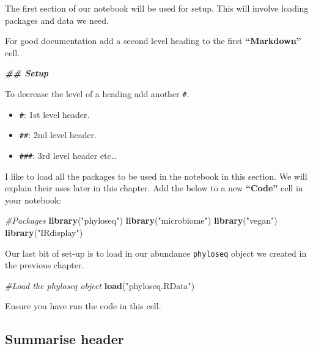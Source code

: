 \documentclass[
]{book}
\newenvironment{Shaded}{\begin{snugshade}}{\end{snugshade}}
\newcommand{\CommentTok}[1]{\textcolor[rgb]{0.56,0.35,0.01}{\textit{#1}}}
\newcommand{\DocumentationTok}[1]{\textcolor[rgb]{0.56,0.35,0.01}{\textbf{\textit{#1}}}}
\newcommand{\FunctionTok}[1]{\textcolor[rgb]{0.13,0.29,0.53}{\textbf{#1}}}
\newcommand{\NormalTok}[1]{#1}
\newcommand{\StringTok}[1]{\textcolor[rgb]{0.31,0.60,0.02}{#1}}
\providecommand{\tightlist}{%
  \setlength{\itemsep}{0pt}\setlength{\parskip}{0pt}}
\begin{document}
The first section of our notebook will be used for setup.
This will involve loading packages and data we need.

For good documentation add a second level heading to the first \textbf{``Markdown''} cell.

\begin{Shaded}
\begin{Highlighting}[]
\DocumentationTok{\#\# Setup}
\end{Highlighting}
\end{Shaded}

To decrease the level of a heading add another \texttt{\#}.

\begin{itemize}
\tightlist
\item
  \texttt{\#}: 1st level header.
\item
  \texttt{\#\#}: 2nd level header.
\item
  \texttt{\#\#\#}: 3rd level header etc\ldots{}
\end{itemize}

I like to load all the packages to be used in the notebook in this section. We will explain their uses later in this chapter. Add the below to a new \textbf{``Code''} cell in your notebook:

\begin{Shaded}
\begin{Highlighting}[]
\CommentTok{\#Packages}
\FunctionTok{library}\NormalTok{(}\StringTok{"phyloseq"}\NormalTok{)}
\FunctionTok{library}\NormalTok{(}\StringTok{"microbiome"}\NormalTok{)}
\FunctionTok{library}\NormalTok{(}\StringTok{"vegan"}\NormalTok{)}
\FunctionTok{library}\NormalTok{(}\StringTok{"IRdisplay"}\NormalTok{)}
\end{Highlighting}
\end{Shaded}

Our last bit of set-up is to load in our abundance \texttt{phyloseq} object we created in the previous chapter.

\begin{Shaded}
\begin{Highlighting}[]
\CommentTok{\#Load the phyloseq object}
\FunctionTok{load}\NormalTok{(}\StringTok{"phyloseq.RData"}\NormalTok{)}
\end{Highlighting}
\end{Shaded}

Ensure you have run the code in this cell.

\hypertarget{summarise-header}{%
\subsection{Summarise header}\label{summarise-header}}
\end{document}
